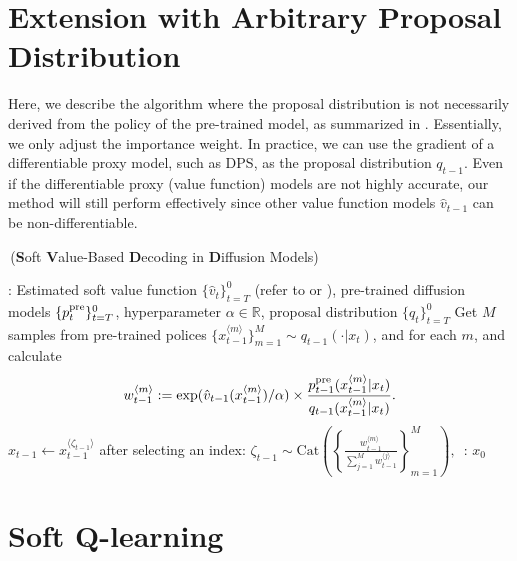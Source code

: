 { \section{Extension with Arbitrary Proposal Distribution}\label{sec:arbitary}


Here, we describe the algorithm where the proposal distribution is not necessarily derived from the policy of the pre-trained model, as summarized in . Essentially, we only adjust the importance weight. In practice, we can use the gradient of a differentiable proxy model, such as DPS, as the proposal distribution $q_{t-1}$. Even if the differentiable proxy (value function) models are not highly accurate, our method will still perform effectively since other value function models $\hat v_{t-1}$ can be non-differentiable.

} 

\begin{algorithm}[!th]
\caption{\alg\,(\textbf{S}oft \textbf{V}alue-Based \textbf{D}ecoding in \textbf{D}iffusion Models)}\label{alg:decoding2}
\begin{algorithmic}[1]
     : Estimated soft value function $\{\hat v_t\}_{t=T}^0$ (refer to  or ), pre-trained diffusion models $\{p^{\mathrm{pre}}_t\}_{t=T}^0$, hyperparameter $\alpha \in \mathbb{R}$, proposal distribution $\{q_t\}_{t=T}^0$
       \STATE  Get $M$ samples from pre-trained polices $\{x^{\langle m \rangle}_{t-1}\}_{m=1}^{M} \sim q_{t-1}(\cdot| x_{t}) $, and for each $m$, and calculate  $$ w^{\langle m \rangle}_{t-1}:= \exp(\hat v_{t-1}(x^{\langle m \rangle}_{t-1})/\alpha)\times \frac{p^{\mathrm{pre}}_{t-1}(x^{\langle m \rangle}_{t-1}| x_{t}) }{q_{t-1}(x^{\langle m \rangle}_{t-1}| x_{t})}.$$ \label{line:select2}
        \STATE $ x_{t-1}   \leftarrow  x^{\langle \zeta_{t-1} \rangle }_{t-1} $ after selecting an index: $ \zeta_{t-1}  \sim \mathrm{Cat}\left ( \left \{\frac{w^{\langle m \rangle}_{t-1}}{\sum_{j=1}^{M} w^{\langle j \rangle}_{t-1} } \right \}_{m=1}^{M} \right),\,$ \label{line:select}
     \ENDFOR
  : $x_0$
\end{algorithmic}
\end{algorithm}



\section{Soft Q-learning}\label{sec:soft-q}


